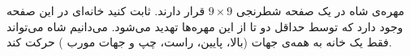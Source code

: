        مهره‌ی شاه در یک صفحه شطرنجی 
       $9\times9$
       قرار دارند. ثابت کنید خانه‌ای در این صفحه وجود دارد که توسط حداقل دو تا از این مهره‌ها تهدید می‌شود.
 ‌می‌دانیم شاه می‌تواند فقط یک خانه به همه‌ی جهات
 (بالا، پایین، راست، چپ و جهات مورب ) حرکت کند.
